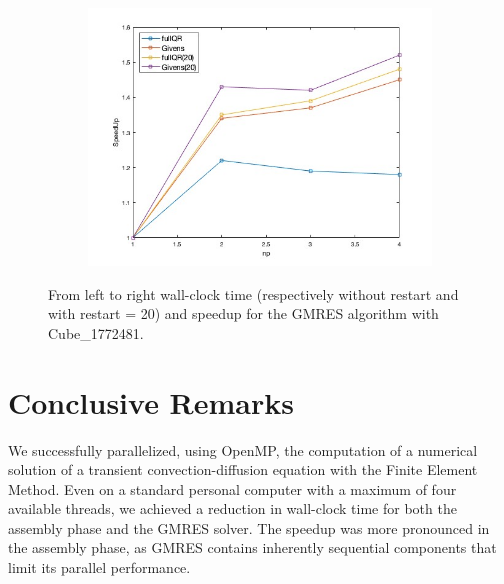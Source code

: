 \documentclass[hidelinks]{article}
\begin{document}
\begin{figure}[H]
\begin{subfigure}{0.32\textwidth}
        \includegraphics[width=\textwidth]{pic/speedupGMRES.jpg}
    \end{subfigure} 
    \caption{From left to right wall-clock time (respectively without restart and with restart = 20) and speedup for the GMRES algorithm with Cube\_1772481.}
\end{figure}

\section{Conclusive Remarks}
We successfully parallelized, using OpenMP, the computation of a numerical solution of a transient convection-diffusion equation with the Finite Element Method.
Even on a standard personal computer with a maximum of four available threads, we achieved a reduction in wall-clock time for both the assembly phase and the GMRES solver. The speedup was more pronounced in the assembly phase, as GMRES contains inherently sequential components that limit its parallel performance.
\end{document}
